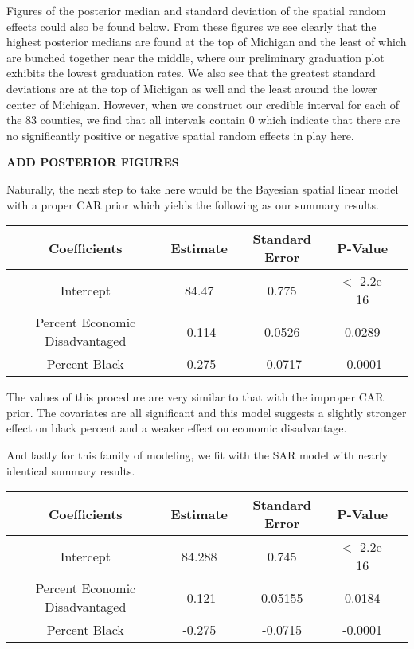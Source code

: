 \documentclass[12pt,letterpaper]{article}
\begin{document}
Figures of the posterior median and standard deviation of the spatial random effects could also be found below. From these figures we see clearly that the highest posterior medians are found at the top of Michigan and the least of which are bunched together near the middle, where our preliminary graduation plot exhibits the lowest graduation rates. We also see that the greatest standard deviations are at the top of Michigan as well and the least around the lower center of Michigan. However, when we construct our credible interval for each of the 83 counties, we find that all intervals contain 0 which indicate that there are no significantly positive or negative spatial random effects in play here. 

\begin{center}
\LARGE\textbf{ADD POSTERIOR FIGURES}
\end{center}

Naturally, the next step to take here would be the Bayesian spatial linear model with a proper CAR prior which yields the following as our summary results. 

\begin{center}
 \begin{tabular}{||c c c c c||} 
 \hline
 Coefficients & Estimate & Standard Error & P-Value\\ [0.5ex] 
 \hline\hline
 Intercept & 84.47 & 0.775 & $<$ 2.2e-16 \\ 
 \hline
 Percent Economic Disadvantaged & -0.114 & 0.0526  & 0.0289 \\
 \hline
 Percent Black & -0.275 & -0.0717 & -0.0001 \\[0.5ex] 
 \hline
\end{tabular}
\end{center}

The values of this procedure are very similar to that with the improper CAR prior. The covariates are all significant and this model suggests a slightly stronger effect on black percent and a weaker effect on economic disadvantage. 

And lastly for this family of modeling, we fit with the SAR model with nearly identical summary results.

\begin{center}
 \begin{tabular}{||c c c c c||} 
 \hline
 Coefficients & Estimate & Standard Error & P-Value\\ [0.5ex] 
 \hline\hline
 Intercept & 84.288 & 0.745 & $<$ 2.2e-16 \\ 
 \hline
 Percent Economic Disadvantaged & -0.121& 0.05155 & 0.0184 \\
 \hline
 Percent Black & -0.275 & -0.0715 & -0.0001 \\[0.5ex] 
 \hline
\end{tabular}
\end{center}
\end{document}
